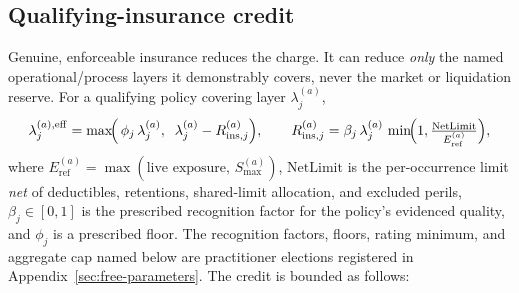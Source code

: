 \subsection{Qualifying-insurance credit}\label{sec:policy-insurance}
Genuine, enforceable insurance reduces the charge. It can reduce \emph{only} the named operational/process layers it demonstrably covers, never the market or liquidation reserve. For a qualifying policy covering layer $\lambda_j^{(a)}$,
\begin{equation}\label{eq:insurance-credit}
\lambda_j^{(a),\mathrm{eff}} = \max\!\Bigl(\,\phi_j\,\lambda_j^{(a)},\;\; \lambda_j^{(a)} - R_{\mathrm{ins},j}^{(a)}\Bigr),
\qquad
R_{\mathrm{ins},j}^{(a)} = \beta_j\,\lambda_j^{(a)}\,\min\!\Bigl(1,\tfrac{\mathrm{NetLimit}}{E_{\mathrm{ref}}^{(a)}}\Bigr),
\end{equation}
where $E_{\mathrm{ref}}^{(a)}=\max(\text{live exposure},\,S_{\max}^{(a)})$, $\mathrm{NetLimit}$ is the per-occurrence limit \emph{net} of deductibles, retentions, shared-limit allocation, and excluded perils, $\beta_j\in[0,1]$ is the prescribed recognition factor for the policy's evidenced quality, and $\phi_j$ is a prescribed floor. The recognition factors, floors, rating minimum, and aggregate cap named below are practitioner elections registered in Appendix~\ref{sec:free-parameters}. The credit is bounded as follows:
